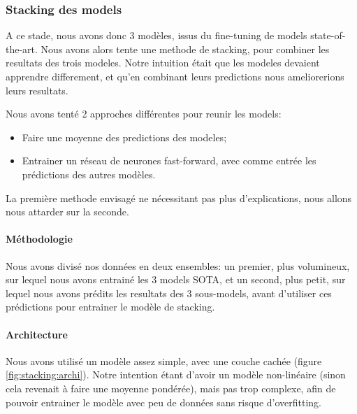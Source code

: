 \documentclass[11pt,a4paper, french]{article}
\begin{document}
\subsubsection{Stacking des models}

A ce stade, nous avons donc 3 modèles, issus du fine-tuning de models state-of-the-art. Nous avons alors tente une methode de stacking, pour combiner les resultats des trois modeles. Notre intuition était que les modeles devaient apprendre differement, et qu'en combinant leurs predictions nous ameliorerions leurs resultats.

Nous avons tenté 2 approches différentes pour reunir les models:

\begin{itemize}
  \item Faire une moyenne des predictions des modeles;
  \item Entrainer un réseau de neurones fast-forward, avec comme entrée les prédictions des autres modèles.
\end{itemize}

La première methode envisagé ne nécessitant pas plus d'explications, nous allons nous attarder sur la seconde.

\paragraph{Méthodologie} Nous avons divisé nos données en deux ensembles: un premier, plus volumineux, sur lequel nous avons entrainé les 3 models SOTA, et un second, plus petit, sur lequel nous avons prédits les resultats des 3 sous-models, avant d'utiliser ces prédictions pour entrainer le modèle de stacking.

\paragraph{Architecture} Nous avons utilisé un modèle assez simple, avec une couche cachée (figure \ref{fig:stacking:archi}). Notre intention étant d'avoir un modèle non-linéaire (sinon cela revenait à faire une moyenne pondérée), mais pas trop complexe, afin de pouvoir entrainer le modèle avec peu de données sans risque d'overfitting.
\end{document}
